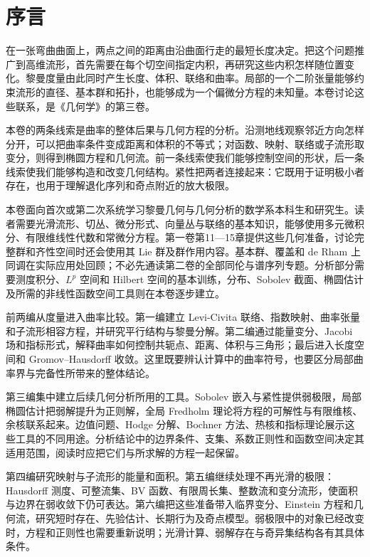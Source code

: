 \chapter*{序言}
在一张弯曲曲面上，两点之间的距离由沿曲面行走的最短长度决定。把这个问题推广到高维流形，首先需要在每个切空间指定内积，再研究这些内积怎样随位置变化。黎曼度量由此同时产生长度、体积、联络和曲率。局部的一个二阶张量能够约束流形的直径、基本群和拓扑，也能够成为一个偏微分方程的未知量。本卷讨论这些联系，是《几何学》的第三卷。

\ProseParagraphBreak
本卷的两条线索是曲率的整体后果与几何方程的分析。沿测地线观察邻近方向怎样分开，可以把曲率条件变成距离和体积的不等式；对函数、映射、联络或子流形取变分，则得到椭圆方程和几何流。前一条线索使我们能够控制空间的形状，后一条线索使我们能够构造和改变几何结构。紧性把两者连接起来：它既用于证明极小者存在，也用于理解退化序列和奇点附近的放大极限。

\ProseParagraphBreak
本卷面向首次或第二次系统学习黎曼几何与几何分析的数学系本科生和研究生。读者需要光滑流形、切丛、微分形式、向量丛与联络的基本知识，能够使用多元微积分、有限维线性代数和常微分方程。第一卷第11—15章提供这些几何准备，讨论完整群和齐性空间时还会使用其 Lie 群及群作用内容。基本群、覆盖和 de Rham 上同调在实际应用处回顾；不必先通读第二卷的全部同伦与谱序列专题。分析部分需要测度积分、\(L^p\) 空间和 Hilbert 空间的基本训练，分布、Sobolev 截面、椭圆估计及所需的非线性函数空间工具则在本卷逐步建立。

\ProseParagraphBreak
前两编从度量进入曲率比较。第一编建立 Levi-Civita 联络、指数映射、曲率张量和子流形相容方程，并研究平行结构与黎曼分解。第二编通过能量变分、Jacobi 场和指标形式，解释曲率如何控制共轭点、距离、体积与三角形；最后进入长度空间和 Gromov--Hausdorff 收敛。这里既要辨认计算中的曲率符号，也要区分局部曲率界与完备性所带来的整体结论。

\ProseParagraphBreak
第三编集中建立后续几何分析所用的工具。Sobolev 嵌入与紧性提供弱极限，局部椭圆估计把弱解提升为正则解，全局 Fredholm 理论将方程的可解性与有限维核、余核联系起来。边值问题、Hodge 分解、Bochner 方法、热核和指标理论展示这些工具的不同用途。分析结论中的边界条件、支集、系数正则性和函数空间决定其适用范围，阅读时应把它们与所求解的方程一起保留。

\ProseParagraphBreak
第四编研究映射与子流形的能量和面积。第五编继续处理不再光滑的极限：Hausdorff 测度、可整流集、BV 函数、有限周长集、整数流和变分流形，使面积与边界在弱收敛下仍可表达。第六编把这些准备带入临界变分、Einstein 方程和几何流，研究短时存在、先验估计、长期行为及奇点模型。弱极限中的对象已经改变时，方程和正则性也需要重新说明；光滑计算、弱解存在与奇异集结构各有其具体条件。

